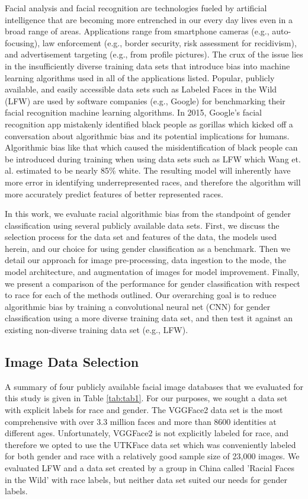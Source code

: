 \documentclass[obeyspaces, spaces, fleqn,10pt]{SelfArx} %
\begin{document}
Facial analysis and facial recognition are technologies fueled by artificial intelligence that are becoming more entrenched in our every day lives even in a broad range of areas. Applications range from smartphone cameras (e.g., auto-focusing), law enforcement (e.g., border security, risk assessment for recidivism), and advertisement targeting (e.g., from profile pictures).\cite{Couch:2017,Lohr:2018,Kim:2018} The crux of the issue lies in the insufficiently diverse training data sets that introduce bias into machine learning algorithms used in all of the applications listed. Popular, publicly available, and easily accessible data sets such as Labeled Faces in the Wild (LFW) are used by software companies (e.g., Google) for benchmarking their facial recognition machine learning algorithms.\cite{LFWTech,Lohr:2018} In 2015, Google's facial recognition app mistakenly identified black people as gorillas which kicked off a conversation about algorithmic bias and its potential implications for humans.\cite{dough2015,Lohr:2018} Algorithmic bias like that which caused the misidentification of black people can be introduced during training when using data sets such as LFW which Wang et. al. estimated to be nearly 85\% white.\cite{wang:2018}  The resulting model will inherently have more error in identifying underrepresented races, and therefore the algorithm will more accurately predict features of better represented races. 

In this work, we evaluate racial algorithmic bias from the standpoint of gender classification using several publicly available data sets. First, we discuss the selection process for the data set and features of the data, the models used herein, and our choice for using gender classification as a benchmark. Then we detail our approach for image pre-processing, data ingestion to the mode, the model architecture, and augmentation of images for model improvement. Finally, we present a comparison of the performance for gender classification with respect to race for each of the methods outlined. Our overarching goal is to reduce algorithmic bias by training a convolutional neural net (CNN) for gender classification using a more diverse training data set, and then test it against an existing non-diverse training data set (e.g., LFW).

\subsection{Image Data Selection}
A summary of four publicly available facial image databases that we evaluated for this study is given in Table \ref{tab:tab1}. For our purposes, we sought a data set with explicit labels for race and gender. The VGGFace2 data set is the most comprehensive with over 3.3 million faces and more than 8600 identities at different ages.\cite{Cao18} Unfortunately, VGGFace2 is not explicitly labeled for race, and therefore we opted to use the UTKFace data set which was conveniently labeled for both gender and race with a relatively good sample size of 23,000 images.\cite{utkface} We evaluated LFW and a data set created by a group in China called 'Racial Faces in the Wild' with race labels, but neither data set suited our needs for gender labels.\cite{LFWTech,wang:2018} 
\end{document}
